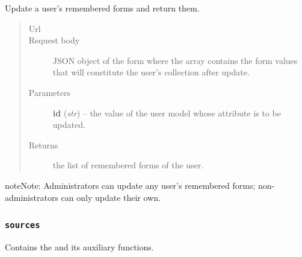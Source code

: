 \documentclass[letterpaper,10pt,english]{sphinxmanual}
\begin{document}
\begin{fulllineitems}
\begin{fulllineitems}
\end{fulllineitems}


\begin{fulllineitems}
\label{api:onlinelinguisticdatabase.controllers.rememberedforms.RememberedformsController.update}
Update a user's remembered forms and return them.
\begin{quote}\begin{description}
\item[{Url }] \leavevmode
{}

\item[{Request body}] \leavevmode
JSON object of the form  where the
array contains the form  values that will constitute the
user's  collection after update.

\item[{Parameters}] \leavevmode
\textbf{id} (\emph{str}) -- the  value of the user model whose
 attribute is to be updated.

\item[{Returns}] \leavevmode
the list of remembered forms of the user.

\end{description}\end{quote}

\begin{notice}{note}{Note:}
Administrators can update any user's remembered forms;
non-administrators can only update their own.
\end{notice}

\end{fulllineitems}


\end{fulllineitems}



\subsubsection{\texttt{sources}}
\label{api:sources}\label{api:module-onlinelinguisticdatabase.controllers.sources}
Contains the {\hyperref[api:onlinelinguisticdatabase.controllers.sources.SourcesController]{}} and its auxiliary functions.
\label{api:module-sources}
\end{document}
